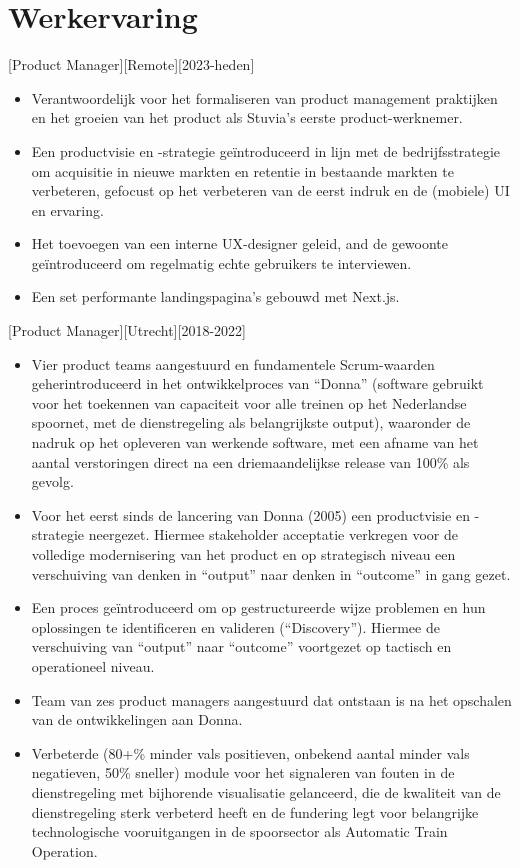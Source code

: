 \documentclass[10pt]{article}
\begin{document}
\makecvtitle

\section{Werkervaring}
\label{sec:work}

[Product Manager][Remote][2023-heden]
\begin{itemize}
    \item Verantwoordelijk voor het formaliseren van product management praktijken en het groeien van het product als Stuvia's eerste product-werknemer.
    \item Een productvisie en -strategie geïntroduceerd in lijn met de bedrijfsstrategie om acquisitie in nieuwe markten en retentie in bestaande markten te verbeteren, gefocust op het verbeteren van de eerst indruk en de (mobiele) UI en ervaring.
    \item Het toevoegen van een interne UX-designer geleid, and de gewoonte geïntroduceerd om regelmatig echte gebruikers te interviewen.
    \item Een set performante landingspagina's gebouwd met Next.js.
\end{itemize}

[Product Manager][Utrecht][2018-2022]
\begin{itemize}
    \item Vier product teams aangestuurd en fundamentele Scrum-waarden geherintroduceerd in het ontwikkelproces van \enquote{Donna} (software gebruikt voor het toekennen van capaciteit voor alle treinen op het Nederlandse spoornet, met de dienstregeling als belangrijkste output), waaronder de nadruk op het opleveren van werkende software, met een afname van het aantal verstoringen direct na een driemaandelijkse release van 100\% als gevolg.
    \item Voor het eerst sinds de lancering van Donna (2005) een productvisie en -strategie neergezet. Hiermee stakeholder acceptatie verkregen voor de volledige modernisering van het product en op strategisch niveau een verschuiving van denken in “output” naar denken in “outcome” in gang gezet.
    \item Een proces geïntroduceerd om op gestructureerde wijze problemen en hun oplossingen te identificeren en valideren (\enquote{Discovery}). Hiermee de verschuiving van “output” naar “outcome” voortgezet op tactisch en operationeel niveau.
    \item Team van zes product managers aangestuurd dat ontstaan is na het opschalen van de ontwikkelingen aan Donna.
    \item Verbeterde (80+\% minder vals positieven, onbekend aantal minder vals negatieven, 50\% sneller) module voor het signaleren van fouten in de dienstregeling met bijhorende visualisatie gelanceerd, die de kwaliteit van de dienstregeling sterk verbeterd heeft en de fundering legt voor belangrijke technologische vooruitgangen in de spoorsector als Automatic Train Operation.
\end{itemize}
\end{document}
